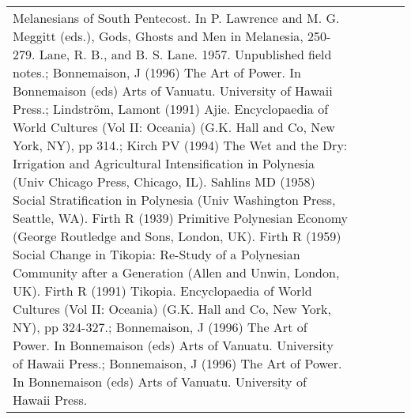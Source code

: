 \begin{longtable}{p{1.8cm}p{1.8cm}p{1.8cm}p{2cm}p{7cm}}
Melanesians of South Pentecost. In P. Lawrence and M. G. Meggitt (eds.), Gods, Ghosts and Men in Melanesia, 250-279. Lane, R. B., and B. S. Lane. 1957. Unpublished field notes.; Bonnemaison, J (1996) The Art of Power. In Bonnemaison (eds) Arts of Vanuatu. University of Hawaii Press.; Lindström, Lamont (1991) Ajie. Encyclopaedia of World Cultures (Vol II: Oceania) (G.K. Hall and Co, New York, NY), pp 314.; Kirch PV (1994) The Wet and the Dry: Irrigation and Agricultural Intensification in Polynesia (Univ Chicago Press, Chicago, IL). Sahlins MD (1958) Social Stratification in Polynesia (Univ Washington Press, Seattle, WA). Firth R (1939) Primitive Polynesian Economy (George Routledge and Sons, London, UK). Firth R (1959) Social Change in Tikopia: Re-Study of a Polynesian Community after a Generation (Allen and Unwin, London, UK). Firth R (1991) Tikopia. Encyclopaedia of World Cultures (Vol II: Oceania) (G.K. Hall and Co, New York, NY), pp 324-327.; Bonnemaison, J (1996) The Art of Power. In Bonnemaison (eds) Arts of Vanuatu. University of Hawaii Press.; Bonnemaison, J (1996) The Art of Power. In Bonnemaison (eds) Arts of Vanuatu. University of Hawaii Press. \\ 

\end{longtable}
